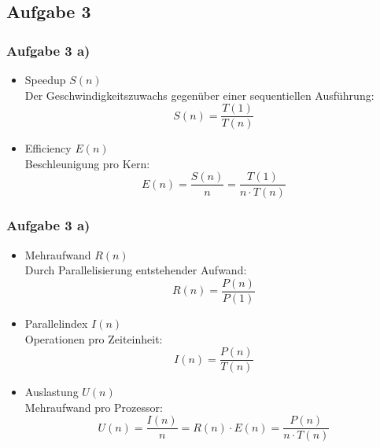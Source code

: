 \documentclass[german,notes,18pt]{beamer}
\begin{document}
	\subsection{Aufgabe 3}
	\begin{frame}
		\frametitle{Aufgabe 3 a)}
		
		\begin{itemize}
			\item Speedup $S(n)$ \\
			Der Geschwindigkeitszuwachs gegenüber einer sequentiellen Ausführung:
			\begin{equation*}
				S(n)=\frac{T(1)}{T(n)}
			\end{equation*}
			\item Efficiency $E(n)$ \\
			Beschleunigung pro Kern:
			\begin{equation*}
				E(n)=\frac{S(n)}{n}=\frac{T(1)}{n\cdot T(n)}
			\end{equation*}
		\end{itemize}
	\end{frame}

	\begin{frame}
		\frametitle{Aufgabe 3 a)}
		
		\begin{itemize}
			\item Mehraufwand $R(n)$ \\
			Durch Parallelisierung entstehender Aufwand:
			\begin{equation*}
				R(n) = \frac{P(n)}{P(1)}
			\end{equation*}
			\item Parallelindex $I(n)$ \\
			Operationen pro Zeiteinheit:
			\begin{equation*}
				I(n)=\frac{P(n)}{T(n)}
			\end{equation*}
			\item Auslastung $U(n)$ \\
			Mehraufwand pro Prozessor:
			\begin{equation*}
			U(n) = \frac{I(n)}{n} = R(n) \cdot E(n) = \frac{P(n)}{n \cdot T(n)}
			\end{equation*}
		\end{itemize}
	\end{frame}
	
\end{document}
